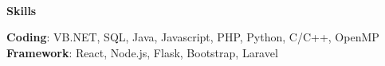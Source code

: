 \begin{flushleft}
    \hrulefill \\
    \begin{large}
        \begin{center}\textbf{Skills}\end{center}
    \end{large} 
\end{flushleft}
\textbf{Coding}: VB.NET, SQL, Java, Javascript, PHP, Python, C/C++, OpenMP \\
\textbf{Framework}: React, Node.js, Flask, Bootstrap, Laravel
